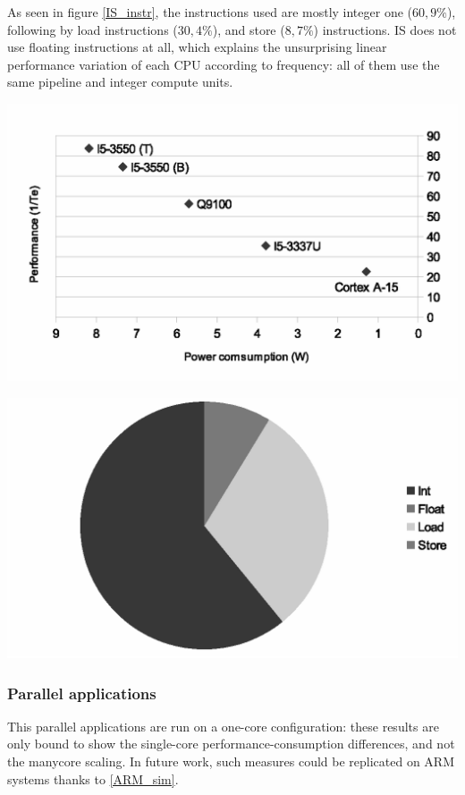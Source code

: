 \documentclass{article}
\newenvironment{Figure}
  {\par\medskip\noindent\center\minipage{0.9\linewidth}}
  {\endminipage\par\bigskip\medskip}
\begin{document}
\begin{multicols}{2}
As seen in figure \ref{IS_instr}, the instructions used are mostly integer one ($60,9\%$), following by load instructions ($30,4\%$), and store ($8,7\%$) instructions. IS does not use floating instructions at all, which explains the unsurprising linear performance variation of each CPU according to frequency: all of them use the same pipeline and integer compute units.
\begin{Figure}
\centering
\includegraphics[width=\linewidth]{IS.eps}
\end{Figure}

\begin{Figure}
\centering
\includegraphics[width=\linewidth]{IS_instr.eps}
\end{Figure}

\subsubsection{Parallel applications}
This parallel applications are run on a one-core configuration: these results are only bound to show the single-core performance-consumption differences, and not the manycore scaling. In future work, such measures could be replicated on ARM systems thanks to \ref{ARM_sim}.


\end{multicols}
\end{document}
